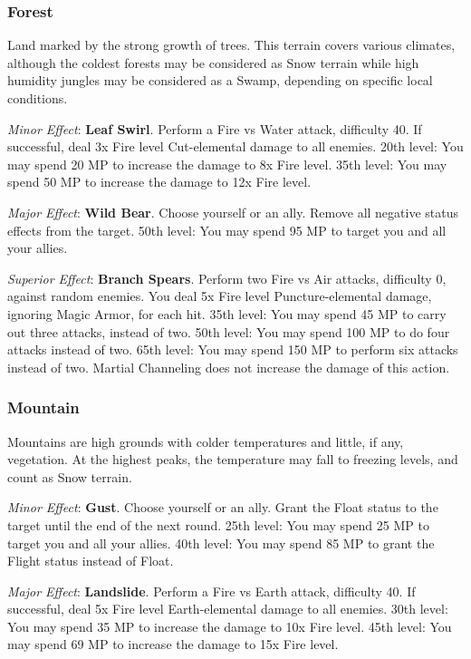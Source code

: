\begin{multicols}{2}
\subsubsection{Forest}

	Land marked by the strong growth of trees. This terrain covers various climates, although the coldest forests may be considered as Snow terrain while high humidity jungles may be considered as a Swamp, depending on specific local conditions.

	\textit{Minor Effect}: \textbf{Leaf Swirl}. Perform a Fire vs Water attack, difficulty 40. If successful, deal 3x Fire level Cut-elemental damage to all enemies. 20th level: You may spend 20 MP to increase the damage to 8x Fire level. 35th level: You may spend 50 MP to increase the damage to 12x Fire level.

	\textit{Major Effect}: \textbf{Wild Bear}. Choose yourself or an ally. Remove all negative status effects from the target. 50th level: You may spend 95 MP to target you and all your allies.

	\textit{Superior Effect}: \textbf{Branch Spears}. Perform two Fire vs Air attacks, difficulty 0, against random enemies. You deal 5x Fire level Puncture-elemental damage, ignoring Magic Armor, for each hit. 35th level: You may spend 45 MP to carry out three attacks, instead of two. 50th level: You may spend 100 MP to do four attacks instead of two. 65th level: You may spend 150 MP to perform six attacks instead of two. Martial Channeling does not increase the damage of this action.

    \subsubsection{Mountain}

    Mountains are high grounds with colder temperatures and little, if any, vegetation. At the highest peaks, the temperature may fall to freezing levels, and count as Snow terrain.

	\textit{Minor Effect}: \textbf{Gust}. Choose yourself or an ally. Grant the Float status to the target until the end of the next round. 25th level: You may spend 25 MP to target you and all your allies. 40th level: You may spend 85 MP to grant the Flight status instead of Float.

	\textit{Major Effect}: \textbf{Landslide}. Perform a Fire vs Earth attack, difficulty 40. If successful, deal 5x Fire level Earth-elemental damage to all enemies. 30th level: You may spend 35 MP to increase the damage to 10x Fire level. 45th level: You may spend 69 MP to increase the damage to 15x Fire level.


\end{multicols}
